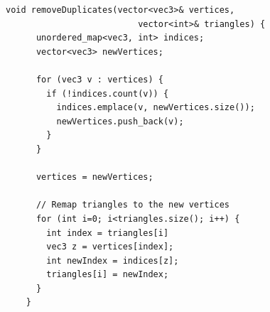\begin{subs}
\begin{minipage}{\textwidth}
  \begin{lstlisting}[caption={Removing duplicates}, label={lst:remove_duplicates}]
    void removeDuplicates(vector<vec3>& vertices,
                          vector<int>& triangles) {
      unordered_map<vec3, int> indices;
      vector<vec3> newVertices;
      
      for (vec3 v : vertices) {
        if (!indices.count(v)) {
          indices.emplace(v, newVertices.size());
          newVertices.push_back(v);
        }
      }

      vertices = newVertices;

      // Remap triangles to the new vertices
      for (int i=0; i<triangles.size(); i++) {
        int index = triangles[i]
        vec3 z = vertices[index];
        int newIndex = indices[z];
        triangles[i] = newIndex;
      }
    }
\end{lstlisting}
\end{minipage}

\end{subs}

